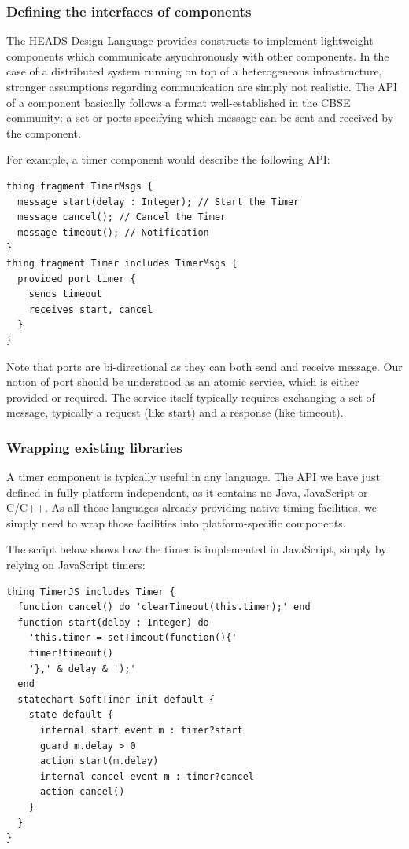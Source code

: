 \subsubsection{Defining the interfaces of components}

The HEADS Design Language provides constructs to implement lightweight components which communicate asynchronously with other components. In the case of a distributed system running on top of a heterogeneous infrastructure, stronger assumptions regarding communication are simply not realistic. The API of a component basically follows a format well-established in the CBSE community: a set or ports specifying which message can be sent and received by the component. 

For example, a timer component would describe the following API: 


\begin{lstlisting}
thing fragment TimerMsgs {  
  message start(delay : Integer); // Start the Timer 
  message cancel(); // Cancel the Timer  
  message timeout(); // Notification 
} 
thing fragment Timer includes TimerMsgs {  
  provided port timer {  
    sends timeout  
    receives start, cancel 
  } 
}
\end{lstlisting}


Note that ports are bi-directional as they can both send and receive message. Our notion of port should be understood as an atomic service, which is either provided or required. The service itself typically requires exchanging a set of message, typically a request (like start) and a response (like timeout). 

\subsubsection{Wrapping existing libraries}
A timer component is typically useful in any language. The API we have just defined in fully platform-independent, as it contains no Java, JavaScript or C/C++. As all those languages already providing native timing facilities, we simply need to wrap those facilities into platform-specific components.  

The script below shows how the timer is implemented in JavaScript, simply by relying on JavaScript timers: 

\begin{lstlisting}
thing TimerJS includes Timer {  
  function cancel() do 'clearTimeout(this.timer);' end  
  function start(delay : Integer) do  
    'this.timer = setTimeout(function(){' 
    timer!timeout()  
    '},' & delay & ');'  
  end  
  statechart SoftTimer init default {  
    state default {  
      internal start event m : timer?start  
      guard m.delay > 0  
      action start(m.delay)  
      internal cancel event m : timer?cancel  
      action cancel()  
    }  
  }  
} 
\end{lstlisting}


